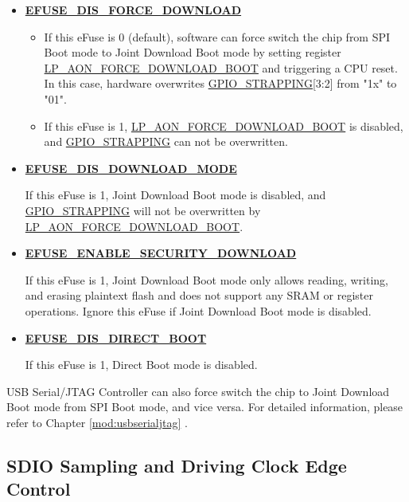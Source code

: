 \documentclass[main\_\_EN.tex]{subfiles}
\begin{document}
\begin{itemize}
    \item \hyperref[fielddesc:EFUSEDISFORCEDOWNLOAD]{\textbf{EFUSE\_DIS\_FORCE\_DOWNLOAD}}
    \begin{itemize}
    \item If this eFuse is 0 (default), software can force switch the chip from SPI Boot mode to Joint Download Boot mode by setting register \hyperref[fielddesc:LPAONFORCEDOWNLOADBOOT]{LP\_AON\_FORCE\_DOWNLOAD\_BOOT} and triggering a CPU reset. In this case, hardware overwrites \hyperref[fielddesc:GPIOSTRAPPING]{GPIO\_STRAPPING}[3:2] from "1x" to "01". 
    
    \item If this eFuse is 1, \hyperref[fielddesc:LPAONFORCEDOWNLOADBOOT]{LP\_AON\_FORCE\_DOWNLOAD\_BOOT} is disabled, and \hyperref[fielddesc:GPIOSTRAPPING]{GPIO\_STRAPPING} can not be overwritten. 
    \end{itemize}

    \item \hyperref[fielddesc:EFUSEDISDOWNLOADMODE]{\textbf{EFUSE\_DIS\_DOWNLOAD\_MODE}}

    If this eFuse is 1, Joint Download Boot mode is disabled, and \hyperref[fielddesc:GPIOSTRAPPING]{GPIO\_STRAPPING} will not be overwritten by \hyperref[fielddesc:LPAONFORCEDOWNLOADBOOT]{LP\_AON\_FORCE\_DOWNLOAD\_BOOT}.

    \item \hyperref[fielddesc:EFUSEENABLESECURITYDOWNLOAD]{\textbf{EFUSE\_ENABLE\_SECURITY\_DOWNLOAD}}

    If this eFuse is 1, Joint Download Boot mode only allows reading, writing, and erasing plaintext flash and does not support any SRAM or register operations. Ignore this eFuse if Joint Download Boot mode is disabled.

    \item \hyperref[fielddesc:EFUSEDISDIRECTBOOT]{\textbf{EFUSE\_DIS\_DIRECT\_BOOT}}

    If this eFuse is 1, Direct Boot mode is disabled.
\end{itemize}

USB Serial/JTAG Controller can also force switch the chip to Joint Download Boot mode from SPI Boot mode, and vice versa. For detailed information, please refer to Chapter \ref{mod:usbserialjtag} \textit{}.


\subsection{SDIO Sampling and Driving Clock Edge Control}
\end{document}

